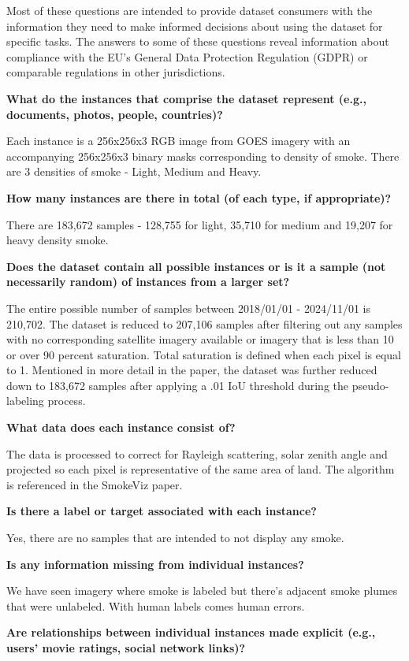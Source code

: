\documentclass{article}
\begin{document}
Most of these questions are intended to provide dataset consumers with the information they need to make informed decisions about using the dataset for specific tasks. The answers to some of these questions reveal information about compliance with the EU’s General Data Protection Regulation (GDPR) or comparable regulations in other jurisdictions.

\textbf{What do the instances that comprise the dataset represent (e.g., documents, photos, people, countries)?}

Each instance is a 256x256x3 RGB image from GOES imagery with an accompanying 256x256x3 binary masks corresponding to density of smoke. There are 3 densities of smoke - Light, Medium and Heavy.


\textbf{How many instances are there in total (of each type, if appropriate)?} 

There are 183,672 samples - 128,755 for light, 35,710 for medium and 19,207 for heavy density smoke.


\textbf{Does the dataset contain all possible instances or is it a sample (not necessarily random) of instances from a larger set? }

The entire possible number of samples between 2018/01/01 - 2024/11/01 is 210,702. The dataset is reduced to 207,106 samples after filtering out any samples with no corresponding satellite imagery available or imagery that is less than 10 or over 90 percent saturation. Total saturation is defined when each pixel is equal to 1. Mentioned in more detail in the paper, the dataset was further reduced down to 183,672 samples after applying a .01 IoU threshold during the pseudo-labeling process.

\textbf{What data does each instance consist of? }

The data is processed to correct for Rayleigh scattering, solar zenith angle and projected so each pixel is representative of the same area of land. The algorithm is referenced in the SmokeViz paper.

\textbf{Is there a label or target associated with each instance?}

Yes, there are no samples that are intended to not display any smoke.

\textbf{Is any information missing from individual instances?}

We have seen imagery where smoke is labeled but there's adjacent smoke plumes that were unlabeled. With human labels comes human errors.

\textbf{Are relationships between individual instances made explicit (e.g., users’ movie ratings, social network links)?}
\end{document}
